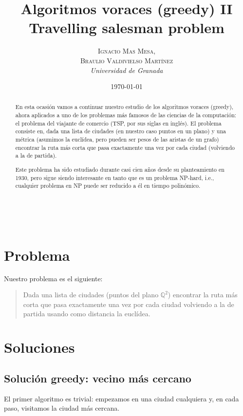 \documentclass[a4paper, 11pt]{article}
\title{\textbf{Algoritmos voraces (greedy) II}\\ %
Travelling salesman problem} %
\author{\textsc{Ignacio Mas Mesa,\\Braulio Valdivielso Martínez} %
\\{\textit{Universidad de Granada}}} %
\date{\today} %
\makeatletter
\renewcommand{\maketitle}{
  \begin{flushright} %
  
  {\LARGE\@title} %
  
  \vspace{50pt} %
  
  {\large\@author} %
  \\\@date %
  \vspace{40pt} %
  \end{flushright}
}
\makeatother
\begin{document}
\maketitle %

\renewcommand{\abstractname}{Abstract} %
\begin{abstract}
En esta ocasión vamos a continuar nuestro estudio de los algoritmos voraces (greedy), ahora aplicados a uno de los problemas más famosos de las ciencias de la computación: el problema del viajante de comercio (TSP, por sus siglas en inglés). El problema consiste en, dada una lista de ciudades (en nuestro caso puntos en un plano) y una métrica (asumimos la euclídea, pero pueden ser pesos de las aristas de un grafo) encontrar la ruta más corta que pasa exactamente una vez por cada ciudad (volviendo a la de partida).

Este problema ha sido estudiado durante casi cien años desde su planteamiento en 1930, pero sigue siendo interesante en tanto que es un problema NP-hard, i.e., cualquier problema en NP puede ser reducido a él en tiempo polinómico.
\end{abstract}

\vspace{30pt} %


  \tableofcontents

\pagebreak


\section{Problema}
Nuestro problema es el siguiente:
\begin{quote}
Dada una lista de ciudades (puntos del plano ${\mathbb Q}^2$) encontrar la ruta más corta que pasa exactamente una vez por cada ciudad volviendo a la de partida usando como distancia la euclídea.
\end{quote}

\section{Soluciones}
\subsection{Solución greedy: vecino más cercano}
El primer algoritmo es trivial: empezamos en una ciudad cualquiera y, en cada paso, visitamos la ciudad más cercana.
\end{document}
